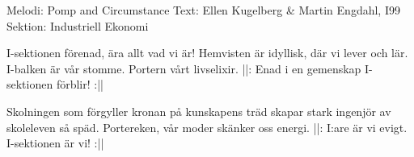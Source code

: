 \begin{song}

\begin{songmeta}
Melodi: Pomp and Circumstance
Text: Ellen Kugelberg \& Martin Engdahl, I99
Sektion: Industriell Ekonomi
\end{songmeta}

\begin{songtext}
I-sektionen förenad,
ära allt vad vi är!
Hemvisten är idyllisk,
där vi lever och lär.
I-balken är vår stomme.
Portern vårt livselixir.
||: Enad i en gemenskap
I-sektionen förblir! :||

Skolningen som förgyller
kronan på kunskapens träd
skapar stark ingenjör av
skoleleven så späd.
Portereken, vår moder
skänker oss energi.
||: I:are är vi evigt.
I-sektionen är vi! :||
\end{songtext}
\end{song}
